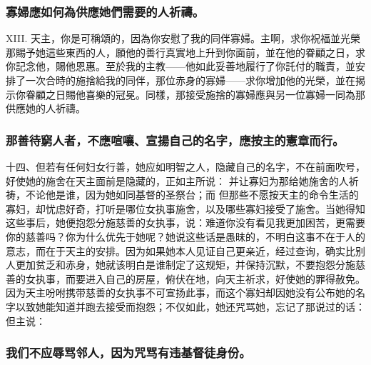 
\subsubsection{寡婦應如何為供應她們需要的人祈禱。}

XIII. 天主，你是可稱頌的，因為你安慰了我的同伴寡婦。主啊，求你祝福並光榮那賜予她這些東西的人，願他的善行真實地上升到你面前，並在他的眷顧之日，求你記念他，賜他恩惠。至於我的主教——他如此妥善地履行了你託付的職責，並安排了一次合時的施捨給我的同伴，那位赤身的寡婦——求你增加他的光榮，並在揭示你眷顧之日賜他喜樂的冠冕。同樣，那接受施捨的寡婦應與另一位寡婦一同為那供應她的人祈禱。\par


\subsubsection{那善待窮人者，不應喧嚷、宣揚自己的名字，應按主的憲章而行。}

十四、但若有任何妇女行善，她应如明智之人，隐藏自己的名字，不在前面吹号，好使她的施舍在天主面前是隐藏的，正如主所说：  并让寡妇为那给她施舍的人祈祷，不论他是谁，因为她如同基督的圣祭台；而 但那些不愿按天主的命令生活的寡妇，却忧虑好奇，打听是哪位女执事施舍，以及哪些寡妇接受了施舍。当她得知这些事后，她便抱怨分施慈善的女执事，说：难道你没有看见我更加困苦，更需要你的慈善吗？你为什么优先于她呢？她说这些话是愚昧的，不明白这事不在于人的意志，而在于天主的安排。因为如果她本人见证自己更亲近，经过查询，确实比别人更加贫乏和赤身，她就该明白是谁制定了这规矩，并保持沉默，不要抱怨分施慈善的女执事，而要进入自己的房屋，俯伏在地，向天主祈求，好使她的罪得赦免。因为天主吩咐携带慈善的女执事不可宣扬此事，而这个寡妇却因她没有公布她的名字以致她能知道并跑去接受而抱怨；不仅如此，她还咒骂她，忘记了那说过的话：  但主说： \par


\subsubsection{我们不应辱骂邻人，因为咒骂有违基督徒身份。}

